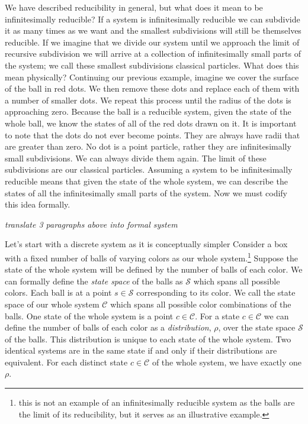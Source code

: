 \documentclass{article}
\begin{document}
	 We have described reducibility in general, but what does it mean to be infinitesimally reducible? If a system is infinitesimally reducible we can subdivide it as many times as we want and the smallest subdivisions will still be themselves reducible. If we imagine that we divide our system until we approach the limit of recursive subdivision we will arrive at a collection of infinitesimally small parts of the system; we call these smallest subdivisions classical particles. What does this mean physically? Continuing our previous example, imagine we cover the surface of the ball in red dots. We then remove these dots and replace each of them with a number of smaller dots. We repeat this process until the radius of the dots is approaching zero. Because the ball is a reducible system, given the state of the whole ball, we know the states of all of the red dots drawn on it. It is important to note that the dots do not ever become points. They are always have radii that are greater than zero. No dot is a point particle, rather they are infinitesimally small subdivisions. We can always divide them again. The limit of these subdivisions are our classical particles. Assuming a system to be infinitesimally reducible means that given the state of the whole system, we can describe the states of all the infinitesimally small parts of the system. Now we must codify this idea formally.
	 
	 \emph{translate 3 paragraphs above into formal system}
	
	Let's start with a discrete system as it is conceptually simpler Consider a box with a fixed number of balls of varying colors as our whole system.\footnote{this is not an example of an infinitesimally reducible system as the balls are the limit of its reducibility, but it serves as an illustrative example.} Suppose the state of the whole system will be defined by the number of balls of each color. We can formally define the \textit{state space} of the balls as $\mathcal{S}$ which spans all possible colors. Each ball is at a point $s \in \mathcal{S}$ corresponding to its color. We call the state space of our whole system $\mathcal{C}$ which spans all possible color combinations of the balls. One state of the whole system is a point $c \in \mathcal{C}$. For a state $c \in \mathcal{C}$ we can define the number of balls of each color as a \textit{distribution}, $\rho$, over the state space $\mathcal{S}$ of the balls. This distribution is unique to each state of the whole system. Two identical systems are in the same state if and only if their distributions are equivalent. For each distinct state $c \in \mathcal{C}$ of the whole system, we have exactly one $\rho$. 
\end{document}
